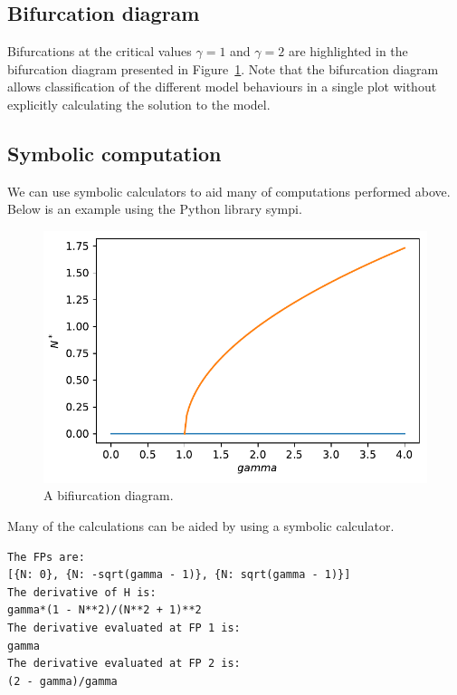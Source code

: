 \documentclass[
  letterpaper,
  DIV=11,
  numbers=noendperiod]{scrreprt}
\begin{document}
\hypertarget{bifurcation-diagram}{%
\subsection{Bifurcation diagram}\label{bifurcation-diagram}}

Bifurcations at the critical values \(\gamma=1\) and \(\gamma=2\) are
highlighted in the bifurcation diagram presented in
Figure~\ref{fig-densmodelbfc}. Note that the bifurcation diagram allows
classification of the different model behaviours in a single plot
without explicitly calculating the solution to the model.

\hypertarget{symbolic-computation}{%
\subsection{Symbolic computation}\label{symbolic-computation}}

We can use symbolic calculators to aid many of computations performed
above. Below is an example using the Python library sympi.

\begin{figure}

{\centering \includegraphics{MA32009-SinglePopDiscreteTimea_files/figure-pdf/fig-densmodelbfc-output-1.pdf}

}

\caption{\label{fig-densmodelbfc}A bifiurcation diagram.}

\end{figure}

Many of the calculations can be aided by using a symbolic calculator.

\hypertarget{code-calc1}{}
\begin{verbatim}
The FPs are:
[{N: 0}, {N: -sqrt(gamma - 1)}, {N: sqrt(gamma - 1)}]
The derivative of H is:
gamma*(1 - N**2)/(N**2 + 1)**2
The derivative evaluated at FP 1 is:
gamma
The derivative evaluated at FP 2 is:
(2 - gamma)/gamma
\end{verbatim}
\end{document}
